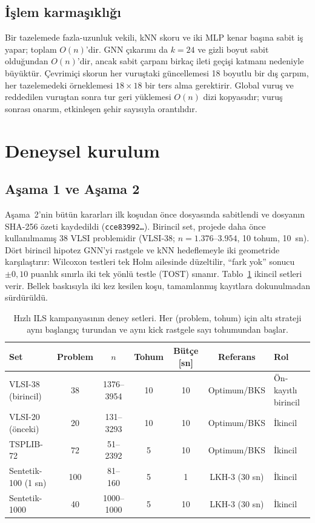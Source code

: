 \documentclass[pdflatex,sn-basic]{sn-jnl}
\begin{document}
\subsection{İşlem karmaşıklığı}\label{sec:yontem-karmasiklik}

Bir tazelemede fazla-uzunluk vekili, kNN skoru ve iki MLP kenar başına sabit iş yapar; toplam
$O(n)$'dir. GNN çıkarımı da $k=24$ ve gizli boyut sabit olduğundan $O(n)$'dir, ancak sabit çarpanı
birkaç ileti geçişi katmanı nedeniyle büyüktür. Çevrimiçi skorun her vuruştaki güncellemesi 18
boyutlu bir dış çarpım, her tazelemedeki örneklemesi $18\times18$ bir ters alma gerektirir. Global
vuruş ve reddedilen vuruştan sonra tur geri yüklemesi $O(n)$ dizi kopyasıdır; vuruş sonrası onarım,
etkinleşen şehir sayısıyla orantılıdır.
\section{Deneysel kurulum}\label{sec:deney-kurulum}

\subsection{Aşama 1 ve Aşama 2}\label{sec:deney-onkayit}

Aşama~2'nin bütün kararları ilk koşudan önce  dosyasında sabitlendi ve dosyanın
SHA-256 özeti kaydedildi (\texttt{cce83992\ldots}).
Birincil set, projede daha önce kullanılmamış 38 VLSI problemidir (VLSI-38; $n=1.376$--$3.954$,
10 tohum, 10~sn).
Dört birincil hipotez GNN'yi rastgele ve kNN hedeflemeyle iki geometride karşılaştırır: Wilcoxon
testleri tek Holm ailesinde düzeltilir, ``fark yok'' sonucu $\pm0{,}10$ puanlık sınırla iki tek
yönlü testle (TOST) sınanır.
Tablo~\ref{tab:v2-sets} ikincil setleri verir. Bellek baskısıyla iki kez kesilen koşu, tamamlanmış
kayıtlara dokunulmadan sürdürüldü.

\begin{table}[!htbp]
\centering\small\setlength{\tabcolsep}{3pt}
\caption{Hızlı ILS kampanyasının deney setleri. Her (problem, tohum) için altı strateji aynı başlangıç turundan ve aynı kick rastgele sayı tohumundan başlar.}
\label{tab:v2-sets}
\begin{tabularx}{\textwidth}{@{}>{\raggedright\arraybackslash}Xcccccl@{}}
\toprule
Set & Problem & $n$ & Tohum & Bütçe [sn] & Referans & Rol \\
\midrule
VLSI-38 (birincil) & 38 & 1376--3954 & 10 & 10 & Optimum/BKS & Ön-kayıtlı birincil \\
VLSI-20 (önceki) & 20 & 131--3293 & 10 & 10 & Optimum/BKS & İkincil \\
TSPLIB-72 & 72 & 51--2392 & 5 & 10 & Optimum/BKS & İkincil \\
Sentetik-100 (1 sn) & 100 & 81--160 & 5 & 1 & LKH-3 (30 sn) & İkincil \\
Sentetik-1000 & 40 & 1000--1000 & 5 & 10 & LKH-3 (30 sn) & İkincil \\
\bottomrule
\end{tabularx}
\end{table}
\end{document}
